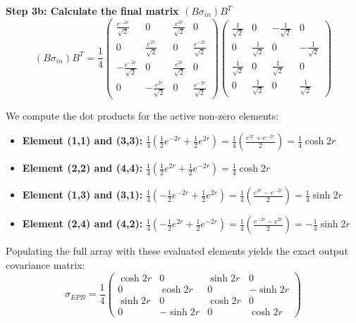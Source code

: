 \textbf{Step 3b: Calculate the final matrix $(B \sigma_{in}) B^T$}
\begin{equation*}
(B \sigma_{in}) B^T = \frac{1}{4} \begin{pmatrix} \frac{e^{-2r}}{\sqrt{2}} & 0 & \frac{e^{2r}}{\sqrt{2}} & 0 \\ 0 & \frac{e^{2r}}{\sqrt{2}} & 0 & \frac{e^{-2r}}{\sqrt{2}} \\ -\frac{e^{-2r}}{\sqrt{2}} & 0 & \frac{e^{2r}}{\sqrt{2}} & 0 \\ 0 & -\frac{e^{2r}}{\sqrt{2}} & 0 & \frac{e^{-2r}}{\sqrt{2}} \end{pmatrix} \begin{pmatrix} \frac{1}{\sqrt{2}} & 0 & -\frac{1}{\sqrt{2}} & 0 \\ 0 & \frac{1}{\sqrt{2}} & 0 & -\frac{1}{\sqrt{2}} \\ \frac{1}{\sqrt{2}} & 0 & \frac{1}{\sqrt{2}} & 0 \\ 0 & \frac{1}{\sqrt{2}} & 0 & \frac{1}{\sqrt{2}} \end{pmatrix}
\end{equation*}

We compute the dot products for the active non-zero elements:
\begin{itemize}
    \item \textbf{Element (1,1) and (3,3):} $\frac{1}{4} \left( \frac{1}{2}e^{-2r} + \frac{1}{2}e^{2r} \right) = \frac{1}{4}\left( \frac{e^{2r} + e^{-2r}}{2} \right) = \frac{1}{4}\cosh 2r$
    \item \textbf{Element (2,2) and (4,4):} $\frac{1}{4} \left( \frac{1}{2}e^{2r} + \frac{1}{2}e^{-2r} \right) = \frac{1}{4}\cosh 2r$
    \item \textbf{Element (1,3) and (3,1):} $\frac{1}{4} \left( -\frac{1}{2}e^{-2r} + \frac{1}{2}e^{2r} \right) = \frac{1}{4}\left( \frac{e^{2r} - e^{-2r}}{2} \right) = \frac{1}{4}\sinh 2r$
    \item \textbf{Element (2,4) and (4,2):} $\frac{1}{4} \left( -\frac{1}{2}e^{2r} + \frac{1}{2}e^{-2r} \right) = \frac{1}{4}\left( \frac{e^{-2r} - e^{2r}}{2} \right) = -\frac{1}{4}\sinh 2r$
\end{itemize}

Populating the full array with these evaluated elements yields the exact output covariance matrix:
\begin{equation}
\sigma_{EPR} = \frac{1}{4} \begin{pmatrix} \cosh 2r & 0 & \sinh 2r & 0 \\ 0 & \cosh 2r & 0 & -\sinh 2r \\ \sinh 2r & 0 & \cosh 2r & 0 \\ 0 & -\sinh 2r & 0 & \cosh 2r \end{pmatrix}
\end{equation}
